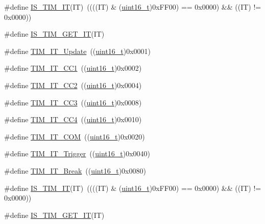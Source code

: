 \begin{DoxyCompactItemize}
\item 
\#define \hyperlink{group___t_i_m__interrupt__sources_ga14fce0f8dbe0925e45b415b34bd162c9}{I\+S\+\_\+\+T\+I\+M\+\_\+\+IT}(IT)~((((IT) \& (\hyperlink{_p_e___types_8h_a1f1825b69244eb3ad2c7165ddc99c956}{uint16\+\_\+t})0x\+F\+F00) == 0x0000) \&\& ((\+I\+T) != 0x0000))
\item 
\#define \hyperlink{group___t_i_m__interrupt__sources_ga38e9d740c8d4ed8fcaced73816c124e6}{I\+S\+\_\+\+T\+I\+M\+\_\+\+G\+E\+T\+\_\+\+IT}(IT)
\item 
\#define \hyperlink{group___t_i_m__interrupt__sources_ga8fb63577fec9a3e7c7f5f3eb775ee624}{T\+I\+M\+\_\+\+I\+T\+\_\+\+Update}~((\hyperlink{_p_e___types_8h_a1f1825b69244eb3ad2c7165ddc99c956}{uint16\+\_\+t})0x0001)
\item 
\#define \hyperlink{group___t_i_m__interrupt__sources_ga02267a938ab4722c5013fffa447cf5a6}{T\+I\+M\+\_\+\+I\+T\+\_\+\+C\+C1}~((\hyperlink{_p_e___types_8h_a1f1825b69244eb3ad2c7165ddc99c956}{uint16\+\_\+t})0x0002)
\item 
\#define \hyperlink{group___t_i_m__interrupt__sources_ga60f6b6c424b62ca58d3fafd8f5955e4f}{T\+I\+M\+\_\+\+I\+T\+\_\+\+C\+C2}~((\hyperlink{_p_e___types_8h_a1f1825b69244eb3ad2c7165ddc99c956}{uint16\+\_\+t})0x0004)
\item 
\#define \hyperlink{group___t_i_m__interrupt__sources_ga6aef020aebafd9e585283fbbaf8b841f}{T\+I\+M\+\_\+\+I\+T\+\_\+\+C\+C3}~((\hyperlink{_p_e___types_8h_a1f1825b69244eb3ad2c7165ddc99c956}{uint16\+\_\+t})0x0008)
\item 
\#define \hyperlink{group___t_i_m__interrupt__sources_ga1dce7f1bc32a258f2964cb7c05f413a6}{T\+I\+M\+\_\+\+I\+T\+\_\+\+C\+C4}~((\hyperlink{_p_e___types_8h_a1f1825b69244eb3ad2c7165ddc99c956}{uint16\+\_\+t})0x0010)
\item 
\#define \hyperlink{group___t_i_m__interrupt__sources_gaeb7eff6c39922814e7ee47c0820c3d9f}{T\+I\+M\+\_\+\+I\+T\+\_\+\+C\+OM}~((\hyperlink{_p_e___types_8h_a1f1825b69244eb3ad2c7165ddc99c956}{uint16\+\_\+t})0x0020)
\item 
\#define \hyperlink{group___t_i_m__interrupt__sources_ga339629d21f2490729b28905f5c04bad1}{T\+I\+M\+\_\+\+I\+T\+\_\+\+Trigger}~((\hyperlink{_p_e___types_8h_a1f1825b69244eb3ad2c7165ddc99c956}{uint16\+\_\+t})0x0040)
\item 
\#define \hyperlink{group___t_i_m__interrupt__sources_gad16adab3ac1a4a552a86da069702f24b}{T\+I\+M\+\_\+\+I\+T\+\_\+\+Break}~((\hyperlink{_p_e___types_8h_a1f1825b69244eb3ad2c7165ddc99c956}{uint16\+\_\+t})0x0080)
\item 
\#define \hyperlink{group___t_i_m__interrupt__sources_ga14fce0f8dbe0925e45b415b34bd162c9}{I\+S\+\_\+\+T\+I\+M\+\_\+\+IT}(IT)~((((IT) \& (\hyperlink{_p_e___types_8h_a1f1825b69244eb3ad2c7165ddc99c956}{uint16\+\_\+t})0x\+F\+F00) == 0x0000) \&\& ((\+I\+T) != 0x0000))
\item 
\#define \hyperlink{group___t_i_m__interrupt__sources_ga38e9d740c8d4ed8fcaced73816c124e6}{I\+S\+\_\+\+T\+I\+M\+\_\+\+G\+E\+T\+\_\+\+IT}(IT)
\end{DoxyCompactItemize}



